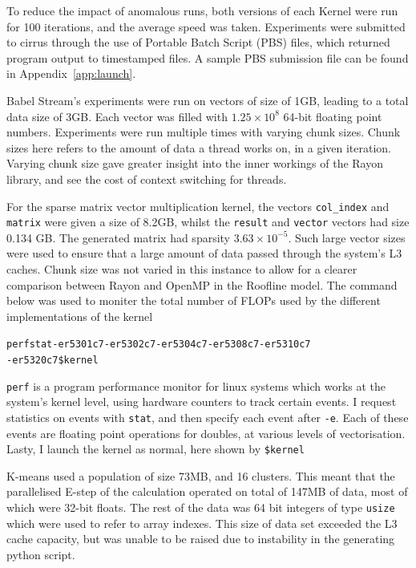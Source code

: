 To reduce the impact of anomalous runs, both versions of each Kernel were run for 100 iterations, and the average speed was taken. Experiments were submitted to cirrus through the use of Portable Batch Script (PBS) files, which returned program output to timestamped files. A sample PBS submission file can be found in Appendix~\ref{app:launch}.

Babel Stream's experiments were run on vectors of size of 1GB, leading to a total data size of 3GB. Each vector was filled with $1.25\times10^8$ 64-bit floating point numbers. Experiments were run multiple times with varying chunk sizes. Chunk sizes here refers to the amount of data a thread works on, in a given iteration. Varying chunk size gave greater insight into the inner workings of the Rayon library, and see the cost of context switching for threads.

For the sparse matrix vector multiplication kernel, the vectors \texttt{col\_index} and \texttt{matrix} were given a size of 8.2GB, whilst the \texttt{result} and \texttt{vector} vectors had size 0.134 GB. The generated matrix had sparsity $3.63 \times 10^{-5}$. Such large vector sizes were used to ensure that a large amount of data passed through the system's L3 caches. Chunk size was not varied in this instance to allow for a clearer comparison between Rayon and OpenMP in the Roofline model. The command below was used to moniter the total number of FLOPs used by the different implementations of the kernel

\begin{alltt}
\footnotesize
perf stat -e r5301c7 -e r5302c7 -e r5304c7 -e r5308c7 -e r5310c7 
          -e r5320c7 \$kernel 
\end{alltt}

\texttt{perf} is a program performance monitor for linux systems which works at the system's kernel level, using hardware counters to track certain events. I request statistics on events with \texttt{stat}, and then specify each event after \texttt{-e}. Each of these events are floating point operations for doubles, at various levels of vectorisation. Lasty, I launch the kernel as normal, here shown by \texttt{\$kernel}

K-means used a population of size 73MB, and 16 clusters. This meant that the parallelised E-step of the calculation operated on total of 147MB of data, most of which were 32-bit floats. The rest of the data was 64 bit integers of type \texttt{usize} which were used to refer to array indexes. This size of data set exceeded the L3 cache capacity, but was unable to be raised due to instability in the generating python script.

